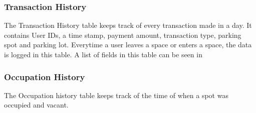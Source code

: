 \documentclass{article}
\begin{document}
\subsubsection{\textbf{Transaction History}} The Transaction History table keeps track of every transaction made in a day. It contains User IDs, a time stamp, payment amount, transaction type, parking spot and parking lot. Everytime a user leaves a space or enters a space, the data is logged in this table. A list of fields in this table can be seen in 

\subsubsection{\textbf{Occupation History}} The Occupation history table keeps track of the time of when a spot was occupied and vacant.
\end{document}
